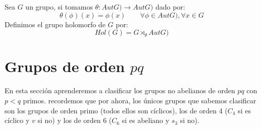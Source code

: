 \begin{definicion}
    Sea $G$ un grupo, si tomamos $\theta:AutG)\to AutG)$ dado por:
    \begin{equation*}
        \theta(\phi)(x) = \phi(x) \qquad \forall \phi \in AutG), \forall x\in G
    \end{equation*}
    Definimos el grupo holomorfo de $G$ por:
    \begin{equation*}
        Hol(G) = G\rtimes_\theta AutG)
    \end{equation*}
\end{definicion}

\section{Grupos de orden $pq$}
\noindent
En esta sección aprenderemos a clasificar los grupos no abelianos de orden $pq$ con $p<q$ primos. recordemos que por ahora, los únicos grupos que sabemos clasificar son los grupos de orden primo (todos ellos son cíclicos), los de orden 4 ($C_4$ si es cíclico y $v$ si no) y los de orden 6 ($C_6$ si es abeliano y $s_3$ si no).\\

